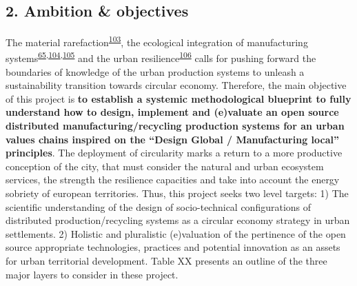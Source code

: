 \documentclass[
  11pt,
  a4paperpaper,
  onecolumn]{article}
\begin{document}
\hypertarget{ambition-objectives}{%
\subsection{2. Ambition \& objectives}\label{ambition-objectives}}

The material
rarefaction\textsuperscript{\protect\hyperlink{ref-hultman2021}{103}},
the ecological integration of manufacturing
systems\textsuperscript{\protect\hyperlink{ref-Bakshi2019a}{65},\protect\hyperlink{ref-Bakshi2015}{104},\protect\hyperlink{ref-Saladini2018}{105}}
and the urban
resilience\textsuperscript{\protect\hyperlink{ref-xu2021e}{106}} calls
for pushing forward the boundaries of knowledge of the urban production
systems to unleash a sustainability transition towards circular economy.
Therefore, the main objective of this project is \textbf{to establish a
systemic methodological blueprint to fully understand how to design,
implement and (e)valuate an open source distributed
manufacturing/recycling production systems for an urban values chains
inspired on the ``Design Global / Manufacturing local'' principles}. The
deployment of circularity marks a return to a more productive conception
of the city, that must consider the natural and urban ecosystem
services, the strength the resilience capacities and take into account
the energy sobriety of european territories. Thus, this project seeks
two level targets: 1) The scientific understanding of the design of
socio-technical configurations of distributed production/recycling
systems as a circular economy strategy in urban settlements. 2) Holistic
and pluralistic (e)valuation of the pertinence of the open source
appropriate technologies, practices and potential innovation as an
assets for urban territorial development. Table XX presents an outline
of the three major layers to consider in these project.

\small
\end{document}

